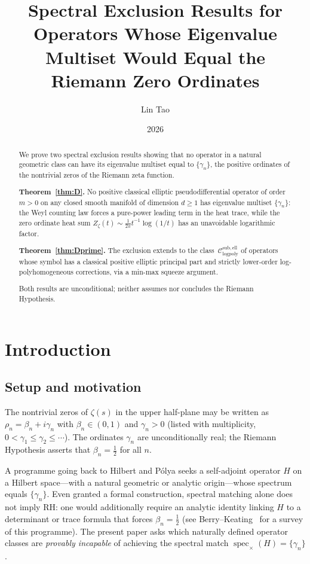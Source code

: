 \documentclass[12pt]{amsart}
\title[Spectral Exclusion Results for Riemann Zero Operators]{%
  Spectral Exclusion Results for Operators Whose Eigenvalue
  Multiset Would Equal the Riemann Zero Ordinates}
\author{Lin Tao}
\date{2026}
\newcommand{\Csub}{\mathcal{C}_{\mathrm{logpoly}}^{\mathrm{sub,ell}}}
\begin{document}
\begin{abstract}
We prove two spectral exclusion results showing that no operator in
a natural geometric class can have its eigenvalue multiset equal to
$\{\gamma_n\}$, the positive ordinates of the nontrivial zeros of
the Riemann zeta function.

\textbf{Theorem~\ref{thm:D}.}  No positive classical elliptic
pseudodifferential operator of order $m>0$ on any closed smooth
manifold of dimension $d\ge 1$ has eigenvalue multiset $\{\gamma_n\}$:
the Weyl counting law forces a pure-power leading term in the heat
trace, while the zero ordinate heat sum
$Z_\zeta(t)\sim\frac{1}{2\pi}t^{-1}\log(1/t)$
has an unavoidable logarithmic factor.

\textbf{Theorem~\ref{thm:Dprime}.}  The exclusion extends to the class~$\Csub$
of operators whose symbol has a classical positive elliptic principal
part and strictly lower-order log-polyhomogeneous corrections,
via a min-max squeeze argument.

Both results are unconditional; neither assumes nor concludes the
Riemann Hypothesis.
\end{abstract}

\maketitle
\tableofcontents

\section{Introduction}
\label{sec:intro}%

\subsection*{Setup and motivation}

The nontrivial zeros of $\zeta(s)$ in the upper half-plane may be
written as $\rho_n = \beta_n + i\gamma_n$ with $\beta_n\in(0,1)$ and
$\gamma_n>0$ (listed with multiplicity, $0<\gamma_1\le\gamma_2\le\cdots$).
The ordinates $\gamma_n$ are unconditionally real; the Riemann
Hypothesis asserts that $\beta_n=\tfrac{1}{2}$ for all $n$.

A programme going back to Hilbert and P\'olya seeks a self-adjoint
operator $H$ on a Hilbert space---with a natural geometric or analytic
origin---whose spectrum equals $\{\gamma_n\}$.  Even granted a formal
construction, spectral matching alone does not imply RH: one would
additionally require an analytic identity linking $H$ to a determinant
or trace formula that forces $\beta_n=\tfrac12$ (see
Berry--Keating~\cite{BerryKeating1999} for a survey of this programme).
The present paper asks which naturally defined operator classes are
\emph{provably incapable} of achieving the spectral match
$\operatorname{spec}_{\times}(H)=\{\gamma_n\}$.
\end{document}
